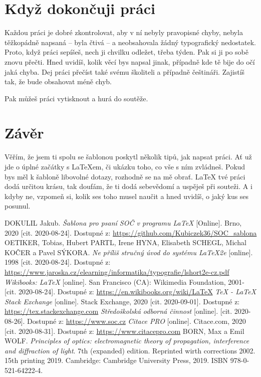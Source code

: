 \documentclass[12pt, a4paper,
    twoside,        %
    openright
]{report}
\newif\ifusebiblatex \usebiblatexfalse %
\begin{document}
\chapter{Když dokončuji práci}

Každou práci je dobré zkontrolovat, aby v ní nebyly pravopisné chyby, nebyla těžkopádně napsaná -- byla čtivá -- a neobsahovala žádný typografický nedostatek. Proto, když práci sepíšeš, nech ji chvilku odležet, třeba týden. Pak si ji po sobě znovu přečti. Hned uvidíš, kolik věcí bys napsal jinak, případně kde tě bije do očí jaká chyba. Dej práci přečíst také svému školiteli a případně češtináři. Zajistíš tak, že bude obsahovat méně chyb.

Pak můžeš práci vytisknout a hurá do soutěže.

\chapter*{Závěr}

Věřím, že jsem ti spolu se šablonou poskytl několik tipů, jak napsat práci. Ať už jde o úplné začátky s \LaTeX em, či ukázku toho, co vše s ním zvládneš. Pokud bys měl k šabloně libovolné dotazy, rozhodně se na mě obrať. \LaTeX{ }tvé práci dodá určitou krásu, tak doufám, že ti dodá sebevědomí a uspěješ při souteži. A i kdyby ne, vzpomeň si, kolik ses toho musel naučit a hned uvidíš, o jaký kus ses posunul.

\ifusebiblatex
    \printbibliography
\else
    \begin{thebibliography}{99}
         DOKULIL Jakub. \textit{Šablona pro psaní SOČ v programu \LaTeX} [Online]. Brno, 2020 [cit. 2020-08-24]. Dostupné z: \url{https://github.com/Kubiczek36/SOC_sablona}
        OETIKER, Tobias, Hubert PARTL, Irene HYNA, Elisabeth SCHEGL, Michal KOČER a Pavel SÝKORA. \textit{Ne příliš stručný úvod do systému LaTeX2e} [online]. 1998 [cit. 2020-08-24]. Dostupné z: \url{https://www.jaroska.cz/elearning/informatika/typografie/lshort2e-cz.pdf}
        \textit{Wikibooks: LaTeX} [online]. San Francisco (CA): Wikimedia Foundation, 2001- [cit. 2020-08-24]. Dostupné z: \url{https://en.wikibooks.org/wiki/LaTeX}
         \textit{TeX - LaTeX Stack Exchange} [online]. Stack Exchange, 2020 [cit. 2020-09-01]. Dostupné z: \url{https://tex.stackexchange.com}
         \textit{Středoškolská odborná činnost} [online]. [cit. 2020-08-26]. Dostupné z: \url{https://www.soc.cz}
        \textit{Citace PRO} [online]. Citace.com, 2020 [cit. 2020-08-31]. Dostupné z: \url{https://www.citacepro.com}
         BORN, Max a Emil WOLF. \textit{Principles of optics: electromagnetic theory of propagation, interference and diffraction of light}. 7th (expanded) edition. Reprinted wirth corrections 2002. 15th printing 2019. Cambridge: Cambridge University Press, 2019. ISBN 978-0-521-64222-4.
    \end{thebibliography}
\fi
\end{document}
